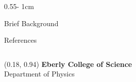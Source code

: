 \documentclass{../psuposter}
\begin{document}
\begin{frame}
\begin{columns}[t, totalwidth=\textwidth]
\begin{column}{0.55\textwidth - 1cm}
\begin{block}{Brief Background}
    \end{block}


    \begin{block}{References}
        
%        
		
    \end{block}

\end{column}
\end{columns}


\begin{textblock}{0.5}(0.18, 0.94)
    \color{white}
    \sffamily
    \textbf{Eberly College of Science}
    \\
    Department of Physics
\end{textblock}


\end{frame}
\end{document}
